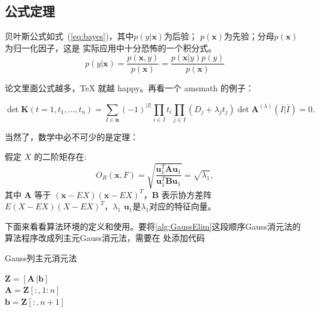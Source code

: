 \subsection{公式定理}

贝叶斯公式如式~(\ref{eq:bayes})，其中$p(y|\mathbf{x})$为后验；
$p(\mathbf{x})$为先验；分母$p(\mathbf{x})$ 为归一化因子，这是
实际应用中十分恐怖的一个积分式。
\begin{equation}\label{eq:bayes}
  p(y|\mathbf{x}) = \frac{p(\mathbf{x},y)}{p(\mathbf{x})}=
  \frac{p(\mathbf{x}|y)p(y)}{p(\mathbf{x})}
\end{equation}

论文里面公式越多，\TeX{} 就越 happy。再看一个 \textsf{amsmath} 的例子：

\begin{equation}\label{eq:detK2}
  \det\mathbf{K}(t=1,t_1,\dots,t_n)=\sum_{I\in\mathbf{n}}(-1)^{\vert I \vert}
  \prod_{i\in I}t_i\prod_{j\in I}(D_j+\lambda_jt_j)\det\mathbf{A}
  ^{(\lambda)}(\overline{I}|\overline{I})=0.
\end{equation}

当然了，数学中必不可少的是定理：
\begin{theorem}\label{theo:rayleigh solution}
  假定 $X$ 的二阶矩存在:
  \begin{equation}\label{eq:rayleigh solution}
         O_R(\mathbf{x},F)=\sqrt{\frac{\mathbf{u}_1^T\mathbf{A}\mathbf{u}_1} {\mathbf{u}_1^T\mathbf{B}\mathbf{u}_1}}=\sqrt{\lambda_1},
  \end{equation}
  其中 $\mathbf{A}$ 等于 $(\mathbf{x}-EX)(\mathbf{x}-EX)^T$，$\mathbf{B}$ 表示协方差阵 $E(X-EX)(X-EX)^T$，$\lambda_1$ $\mathbf{u}_1$是$\lambda_1$对应的特征向量。
\end{theorem}

下面来看看算法环境的定义和使用。要将\cref{alg:GaussElim}这段顺序Gauss消元法的算法程序改成列主元Gauss消元法，需要在 处添加代码

\begin{algorithm}[H]
  \caption{Gauss列主元消元法}
  \label{alg:GaussElim}
  $\boldsymbol{Z} = [\boldsymbol{A}\,| \boldsymbol{b}]$\\
  $\boldsymbol{A} = \boldsymbol{Z}[:,1:n]$\\
  $\boldsymbol{b} = \boldsymbol{Z}[:,n+1]$\\
\end{algorithm}

